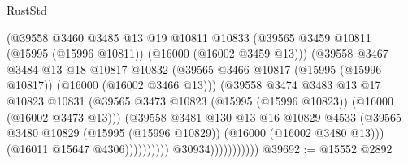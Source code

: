 \begin{lexlean}{RustStd}
\begin{coremodule}
                                    (@39558
                                      @3460
                                      @3485
                                      @13
                                      @19
                                      @10811
                                      @10833
                                      (@39565
                                        @3459
                                        @10811
                                        (@15995 (@15996 @10811))
                                        (@16000 (@16002 @3459 @13)))
                                      (@39558
                                        @3467
                                        @3484
                                        @13
                                        @18
                                        @10817
                                        @10832
                                        (@39565
                                          @3466
                                          @10817
                                          (@15995 (@15996 @10817))
                                          (@16000 (@16002 @3466 @13)))
                                        (@39558
                                          @3474
                                          @3483
                                          @13
                                          @17
                                          @10823
                                          @10831
                                          (@39565
                                            @3473
                                            @10823
                                            (@15995 (@15996 @10823))
                                            (@16000 (@16002 @3473 @13)))
                                          (@39558
                                            @3481
                                            @130
                                            @13
                                            @16
                                            @10829
                                            @4533
                                            (@39565
                                              @3480
                                              @10829
                                              (@15995 (@15996 @10829))
                                              (@16000 (@16002 @3480 @13)))
                                            (@16011 @15647 @4306))))))))))
                          @30934)))))))))))
@39692 := @15552 @2892

\end{coremodule}
\end{lexlean}
